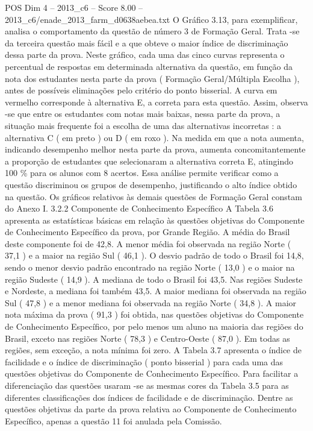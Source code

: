 \begin{textsample}{POS Dim 4 – 2013\_c6 – Score 8.00 – 2013\_c6/enade\_2013\_farm\_d0638aebea.txt}
O Gráfico 3.13, para exemplificar, analisa o comportamento da questão de número 3 de Formação Geral.
Trata -se da terceira questão mais fácil e a que obteve o maior índice de discriminação dessa parte da prova.
Neste gráfico, cada uma das cinco curvas representa o percentual de respostas em determinada alternativa da questão, em função da nota dos estudantes nesta parte da prova ( Formação Geral/Múltipla Escolha ), antes de possíveis eliminações pelo critério do ponto bisserial.
A curva em vermelho corresponde à alternativa E, a correta para esta questão.
Assim, observa -se que entre os estudantes com notas mais baixas, nessa parte da prova, a situação mais frequente foi a escolha de uma das alternativas incorretas : a alternativa C ( em preto ) ou D ( em roxo ).
Na medida em que a nota aumenta, indicando desempenho melhor nesta parte da prova, aumenta concomitantemente a proporção de estudantes que selecionaram a alternativa correta E, atingindo 100 \% para os alunos com 8 acertos.
Essa análise permite verificar como a questão discriminou os grupos de desempenho, justificando o alto índice obtido na questão.
Os gráficos relativos às demais questões de Formação Geral constam do Anexo I. 3.2.2 Componente de Conhecimento Específico A Tabela 3.6 apresenta as estatísticas básicas em relação às questões objetivas do Componente de Conhecimento Específico da prova, por Grande Região.
A média do Brasil deste componente foi de 42,8.
A menor média foi observada na região Norte ( 37,1 ) e a maior na região Sul ( 46,1 ).
O desvio padrão de todo o Brasil foi 14,8, sendo o menor desvio padrão encontrado na região Norte ( 13,0 ) e o maior na região Sudeste ( 14,9 ).
A mediana de todo o Brasil foi 43,5.
Nas regiões Sudeste e Nordeste, a mediana foi também 43,5.
A maior mediana foi observada na região Sul ( 47,8 ) e a menor mediana foi observada na região Norte ( 34,8 ).
A maior nota máxima da prova ( 91,3 ) foi obtida, nas questões objetivas do Componente de Conhecimento Específico, por pelo menos um aluno na maioria das regiões do Brasil, exceto nas regiões Norte ( 78,3 ) e Centro-Oeste ( 87,0 ).
Em todas as regiões, sem exceção, a nota mínima foi zero.
A Tabela 3.7 apresenta o índice de facilidade e o índice de discriminação ( ponto bisserial ) para cada uma das questões objetivas do Componente de Conhecimento Específico.
Para facilitar a diferenciação das questões usaram -se as mesmas cores da Tabela 3.5 para as diferentes classificações dos índices de facilidade e de discriminação.
Dentre as questões objetivas da parte da prova relativa ao Componente de Conhecimento Específico, apenas a questão 11 foi anulada pela Comissão.

\end{textsample}
